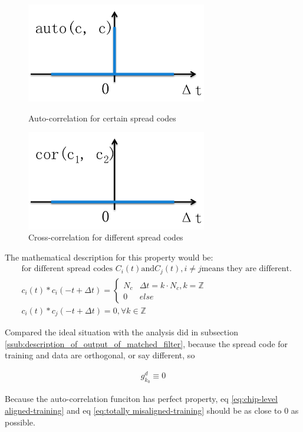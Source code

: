 \documentclass[a4paper]{article}
\begin{document}
\begin{figure}[ht]
	\centering
	\includegraphics[width = 3.1in]{figure/autocorrelation.png}
	\caption{Auto-correlation for certain spread codes}
	\label{fig:auto-correlation}
	\includegraphics[width = 3.1in]{figure/cross-correlation.png}
	\caption{Cross-correlation for different spread codes}
	\label{fig:cross-correlatino}
\end{figure}

The mathematical description for this property would be:
\begin{align}
	&\text{for different spread codes }C_i(t) \text{and} C_j(t), i \neq j \text{means they are different.} \nonumber\\
	&c_i(t) \ast c_i(-t + \Delta t) = 
	\begin{cases}
		N_c &	\Delta t = k \cdot N_c, k = \mathbb{Z}\\
		0 	& 	else
	\end{cases}\\
	&c_i(t) \ast c_j(-t + \Delta t) = 0, \forall k \in \mathbb{Z}
\end{align}

Compared the ideal situation with the analysis did in subsection \ref{ssub:description_of_output_of_matched_filter}, because the spread code for training and data are orthogonal, or say different, so 

\begin{align}
	g^d_{k_0} \equiv 0
\end{align}

Because the auto-correlation funciton has perfect property, eq \ref{eq:chip-level aligned-training} and eq \ref{eq:totally misaligned-training} should be as close to 0 as possible.








\end{document}
